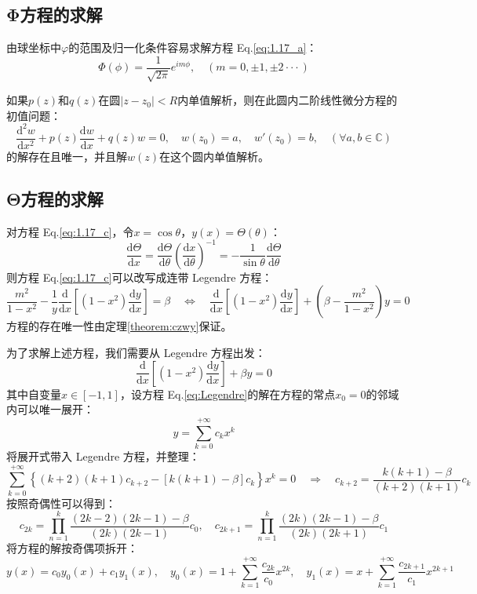 \subsection{Φ方程的求解}
由球坐标中$\varphi$的范围及归一化条件容易求解方程 Eq.\eqref{eq:1.17_a}：
\[\varPhi(\phi)=\frac{1}{\sqrt{2\pi}}e^{im\phi}, \quad (m=0,\pm 1,\pm 2\cdot\cdot\cdot)\]

\begin{theorem}\label{theorem:czwy}
如果$p(z)$和$q(z)$在圆$|z-z_0|<R$内单值解析，则在此圆内二阶线性微分方程的初值问题：
\[\frac{\mathrm{d}^2w}{\mathrm{d}x^2}+p(z)\frac{\mathrm{d}w}{\mathrm{d}x}+q(z)w=0, \quad w(z_0)=a, \quad w'(z_0)=b, \quad (\forall a,b \in \mathbb{C})\]
的解存在且唯一，并且解$w(z)$在这个圆内单值解析。
\end{theorem}

\subsection{Θ方程的求解}
对方程 Eq.\eqref{eq:1.17_c}，令$x=\cos\theta$，$y(x)=\Theta(\theta)$：
\[\frac{\mathrm{d} \Theta}{\mathrm{d} x}=\frac{\mathrm{d} \Theta}{\mathrm{d} \theta}\left ( \frac{\mathrm{d} x}{\mathrm{d} \theta} \right )^{-1}=-\frac{1}{\sin\theta} \frac{\mathrm{d} \Theta}{\mathrm{d} \theta}\]
则方程 Eq.\eqref{eq:1.17_c}可以改写成连带 Legendre 方程：
\[\frac{m^2}{1-x^2}-\frac{1}{y}\frac{\mathrm{d}}{\mathrm{d}{x}} \left [(1-x^2) \frac{\mathrm{d} y}{\mathrm{d}{x}} \right ]=\beta \quad \Leftrightarrow \quad \frac{\mathrm{d}}{\mathrm{d}{x}} \left [(1-x^2) \frac{\mathrm{d} y}{\mathrm{d}{x}} \right ]+\left (\beta- \frac{m^2}{1-x^2} \right )y=0\]
方程的存在唯一性由定理\ref{theorem:czwy}保证。

为了求解上述方程，我们需要从 Legendre 方程出发：
\begin{equation}\label{eq:Legendre}
\frac{\mathrm{d}}{\mathrm{d}{x}} \left [(1-x^2) \frac{\mathrm{d} y}{\mathrm{d}{x}} \right ]+\beta y=0
\end{equation}
其中自变量$x \in [-1,1]$，设方程 Eq.\eqref{eq:Legendre}的解在方程的常点$x_0=0$的邻域内可以唯一展开：
\[y=\sum_{k=0}^{+\infty}c_kx^k\]
将展开式带入 Legendre 方程，并整理：
\[\sum_{k=0}^{+\infty} \left \{ (k+2)(k+1)c_{k+2}-[k(k+1)-\beta]c_k \right \}x^k=0 \quad \Rightarrow \quad c_{k+2}=\frac{k(k+1)-\beta}{(k+2)(k+1)}c_k\]
按照奇偶性可以得到：
\[c_{2k}=\prod_{n=1}^{k}\frac{(2k-2)(2k-1)-\beta}{(2k)(2k-1)}c_0, \quad c_{2k+1}=\prod_{n=1}^{k}\frac{(2k)(2k-1)-\beta}{(2k)(2k+1)}c_1\]
将方程的解按奇偶项拆开：
\[y(x)=c_0y_0(x)+c_1y_1(x), \quad y_0(x)=1+\sum_{k=1}^{+\infty}\frac{c_{2k}}{c_0}x^{2k}, \quad y_1(x)=x+\sum_{k=1}^{+\infty}\frac{c_{2k+1}}{c_1}x^{2k+1}\]


